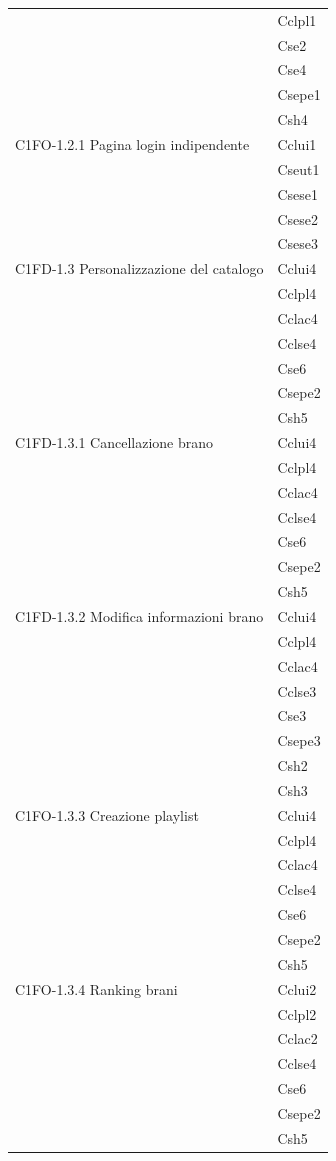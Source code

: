 \begin{footnotesize}
\begin{longtable}[!h]{|l|l|}
 & Cclpl1\\
 & Cse2\\
 & Cse4\\
 & Csepe1\\ 
 & Csh4\\ \hline
C1FO-1.2.1 Pagina login indipendente & Cclui1\\
 & Cseut1\\
 & Csese1\\
 & Csese2\\
 & Csese3\\ \hline
C1FD-1.3 Personalizzazione del catalogo & Cclui4\\
 & Cclpl4\\
 & Cclac4\\
 & Cclse4\\ 
 & Cse6\\ 
 & Csepe2\\ 
 & Csh5\\ \hline 
C1FD-1.3.1 Cancellazione brano &  Cclui4\\
 & Cclpl4\\
 & Cclac4\\
 & Cclse4\\
 & Cse6\\ 
 & Csepe2\\
 & Csh5\\ \hline 
C1FD-1.3.2 Modifica informazioni brano & Cclui4\\
 & Cclpl4\\
 & Cclac4\\
 & Cclse3\\
 & Cse3\\ 
 & Csepe3\\
 & Csh2\\
 & Csh3\\ \hline  
C1FO-1.3.3 Creazione playlist & Cclui4\\
 & Cclpl4\\
 & Cclac4\\
 & Cclse4\\
 & Cse6\\ 
 & Csepe2\\
 & Csh5\\ \hline 
C1FO-1.3.4 Ranking brani & Cclui2\\
 & Cclpl2\\
 & Cclac2\\
 & Cclse4\\
 & Cse6\\ 
 & Csepe2\\
 & Csh5\\ \hline   

\end{longtable}
\end{footnotesize}
